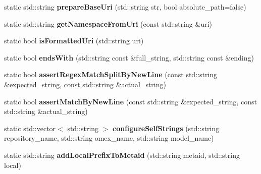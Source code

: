 \begin{DoxyCompactItemize}
\mbox{\label{classomexmeta_1_1OmexMetaUtils_a6694715cf3f5dccd33d416ecc84ff375}} 
static std\+::string {\bfseries prepare\+Base\+Uri} (std\+::string str, bool absolute\+\_\+path=false)
\item 
\mbox{\label{classomexmeta_1_1OmexMetaUtils_a0956bde073b212596d8e4b2ffc983e47}} 
static std\+::string {\bfseries get\+Namespace\+From\+Uri} (const std\+::string \&uri)
\item 
\mbox{\label{classomexmeta_1_1OmexMetaUtils_af663724f2efb0324a64c6a57e8491c13}} 
static bool {\bfseries is\+Formatted\+Uri} (std\+::string uri)
\item 
\mbox{\label{classomexmeta_1_1OmexMetaUtils_a9c2b712b85f74fff9740477660f7b371}} 
static bool {\bfseries ends\+With} (std\+::string const \&full\+\_\+string, std\+::string const \&ending)
\item 
\mbox{\label{classomexmeta_1_1OmexMetaUtils_a4ec81c80bf33d232331ea9ef0b94da61}} 
static bool {\bfseries assert\+Regex\+Match\+Split\+By\+New\+Line} (const std\+::string \&expected\+\_\+string, const std\+::string \&actual\+\_\+string)
\item 
\mbox{\label{classomexmeta_1_1OmexMetaUtils_a6ddc16d56f238ef7ff3c8ab355163ef7}} 
static bool {\bfseries assert\+Match\+By\+New\+Line} (const std\+::string \&expected\+\_\+string, const std\+::string \&actual\+\_\+string)
\item 
\mbox{\label{classomexmeta_1_1OmexMetaUtils_a0b5fd1b4237e1534f2339349efa1dd7a}} 
static std\+::vector$<$ std\+::string $>$ {\bfseries configure\+Self\+Strings} (std\+::string repository\+\_\+name, std\+::string omex\+\_\+name, std\+::string model\+\_\+name)
\item 
\mbox{\label{classomexmeta_1_1OmexMetaUtils_ade5e8d004b8f61618815a854d905a506}} 
static std\+::string {\bfseries add\+Local\+Prefix\+To\+Metaid} (std\+::string metaid, std\+::string local)
\item 
\mbox{\label{classomexmeta_1_1OmexMetaUtils_aca2230ca99338b9dc0fc7d296b0c553b}} 

\end{DoxyCompactItemize}
